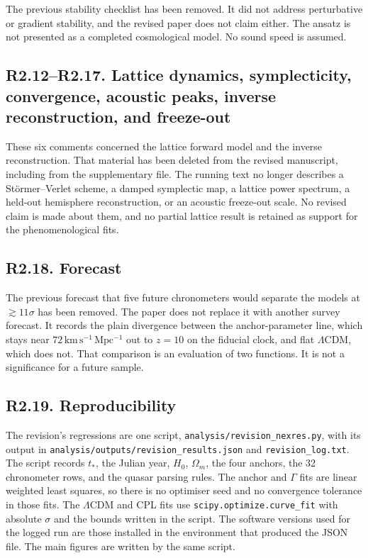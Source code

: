 \documentclass[11pt]{article}
\begin{document}
The previous stability checklist has been removed.
It did not address perturbative or gradient stability, and the revised paper does not claim either.
The ansatz is not presented as a completed cosmological model.
No sound speed is assumed.

\subsection*{R2.12--R2.17. Lattice dynamics, symplecticity, convergence, acoustic peaks, inverse reconstruction, and freeze-out}

These six comments concerned the lattice forward model and the inverse reconstruction.
That material has been deleted from the revised manuscript, including from the supplementary file.
The running text no longer describes a St\"ormer--Verlet scheme, a damped symplectic map, a lattice power spectrum, a held-out hemisphere reconstruction, or an acoustic freeze-out scale.
No revised claim is made about them, and no partial lattice result is retained as support for the phenomenological fits.

\subsection*{R2.18. Forecast}

The previous forecast that five future chronometers would separate the models at $\gtrsim11\sigma$ has been removed.
The paper does not replace it with another survey forecast.
It records the plain divergence between the anchor-parameter line, which stays near $72\,\mathrm{km\,s^{-1}\,Mpc^{-1}}$ out to $z=10$ on the fiducial clock, and flat $\Lambda$CDM, which does not.
That comparison is an evaluation of two functions.
It is not a significance for a future sample.

\subsection*{R2.19. Reproducibility}

The revision's regressions are one script, \texttt{analysis/revision\_nexres.py}, with its output in \texttt{analysis/outputs/revision\_results.json} and \texttt{revision\_log.txt}.
The script records $t_{*}$, the Julian year, $H_{0}$, $\Omega_{m}$, the four anchors, the 32 chronometer rows, and the quasar parsing rules.
The anchor and $\Gamma$ fits are linear weighted least squares, so there is no optimiser seed and no convergence tolerance in those fits.
The $\Lambda$CDM and CPL fits use \texttt{scipy.optimize.curve\_fit} with absolute $\sigma$ and the bounds written in the script.
The software versions used for the logged run are those installed in the environment that produced the JSON file.
The main figures are written by the same script.
\end{document}
